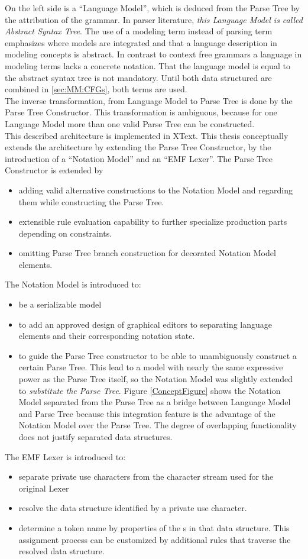 On the left side is a ``Language Model'', which is deduced from the Parse Tree by the attribution of the grammar. In parser literature, \emph{this Language Model is called Abstract Syntax Tree}. The use of a modeling term instead of parsing term emphasizes where models are integrated and that a language description in modeling concepts is abstract. In contrast to context free grammars a language in modeling terms lacks a concrete notation. That the language model is equal to the abstract syntax tree is not mandatory. Until both data structured are combined in \ref{sec:MM:CFGs}, both terms are used. \\
The inverse transformation, from Language Model to Parse Tree is done by the Parse Tree Constructor. This transformation is ambiguous, because for one Language Model more than one valid Parse Tree can be constructed. \\
This described architecture is implemented in XText. This thesis conceptually extends the architecture by extending the Parse Tree Constructor, by the introduction of a ``Notation Model'' and an ``EMF Lexer''.
The Parse Tree Constructor is extended by 
\begin{itemize}
	\item adding valid alternative constructions to the Notation Model and regarding them while constructing the Parse Tree. 
	\item extensible rule evaluation capability to further specialize production parts depending on constraints.
	\item omitting Parse Tree branch construction for decorated Notation Model elements.
\end{itemize}
The Notation Model is introduced to:
\begin{itemize}
	\item be a serializable model
	\item to add an approved design of graphical editors to separating language elements and their corresponding notation state.
	\item to guide the Parse Tree constructor to be able to unambiguously construct a certain Parse Tree. This lead to a model with nearly the same expressive power as the Parse Tree itself, so the Notation Model was slightly extended to \emph{substitute the Parse Tree}. Figure \ref{ConceptFigure} shows the Notation Model separated from the Parse Tree as a bridge between Language Model and Parse Tree because this integration feature is the advantage of the Notation Model over the Parse Tree. The degree of overlapping functionality does not justify separated data structures.
\end{itemize} 
The EMF Lexer is introduced to:
\begin{itemize}
	\item separate private use characters from the character stream used for the original Lexer
	\item resolve the data structure identified by a private use character.
	\item determine a token name by properties of the s in that data structure. This assignment process can be customized by additional rules that traverse the resolved data structure.
\end{itemize}


